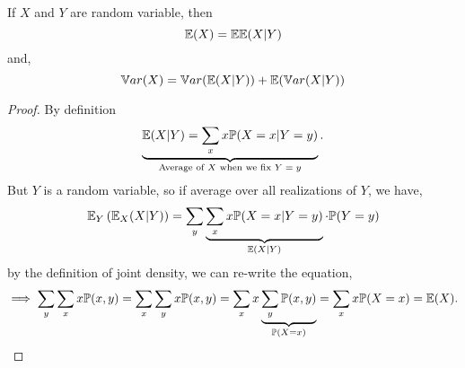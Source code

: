 \begin{theorem}
    If $X$ and $Y$ are random variable, then
    $$\mathbb E(X) = \mathbb E \mathbb E(X|Y)$$
    and,
    $$
    \mathbb V ar(X) = \mathbb V ar(\mathbb E (X|Y)) + \mathbb E (\mathbb V ar(X|Y))
    $$
\end{theorem}
\begin{proof}
    By definition $$\underbrace{\mathbb E(X|Y) = \sum_{x}x\mathbb P(X=x|Y=y)}_\text{Average of $X$ when we fix $Y=y$}.$$ 
    But $Y$ is a random variable, so if average over all realizations of $Y$, we have,
    $$\mathbb E_{Y}\left(\mathbb E_X(X|Y)\right) = \sum_{y}\underbrace{ \sum_{x}x\mathbb P(X=x|Y=y)}_{\mathbb E(X|Y)}\cdot\mathbb P(Y=y)$$
    by the definition of joint density, we can re-write the equation,
     $$
     \implies \sum_{y}\sum_{x}x\mathbb P(x,y) = \sum_{x}\sum_{y}x\mathbb P(x,y) = \sum_{x}x\underbrace{\sum_{y}\mathbb P(x,y)}_{\mathbb P(X=x)} = \sum_{x}x\mathbb P(X=x) = \mathbb E(X).
     $$
\end{proof}